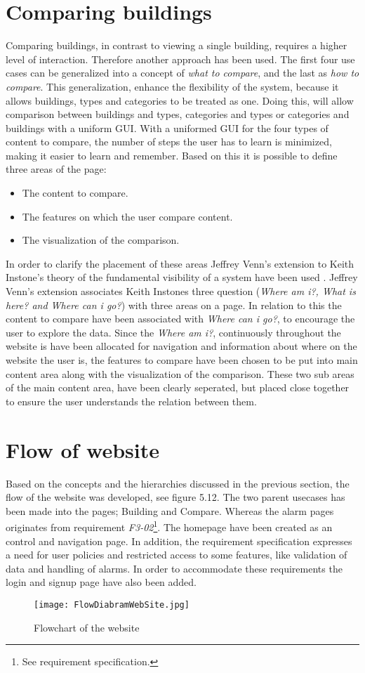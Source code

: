 \section*{Comparing buildings}
Comparing buildings, in contrast to viewing a single building, requires a higher level of interaction. Therefore another approach has been used. The first four use cases can be generalized into a concept of \emph{what to compare}, and the last as \emph{how to compare}. This generalization, enhance the flexibility of the system, because it allows buildings, types and categories to be treated as one. Doing this, will allow comparison between buildings and types, categories and types or categories and buildings with a uniform GUI. With a uniformed GUI for the four types of content to compare, the number of steps the user has to learn is minimized, making it easier to learn and remember. Based on this it is possible to define three areas of the page:
\begin{itemize}
\item The content to compare.
\item The features on which the user compare content.
\item The visualization of the comparison.
\end{itemize}
In order to clarify the placement of these areas Jeffrey Venn's extension to Keith Instone's theory of the fundamental visibility of a system have been used \cite{interaction}. Jeffrey Venn's extension associates Keith Instones three question (\emph{Where am i?, What is here? and Where can i go?}) with three areas on a page. In relation to this the content to compare have been associated with \emph{Where can i go?}, to encourage the user to explore the data. Since the \emph{Where am i?}, continuously throughout the website is have been allocated for navigation and information about where on the website the user is, the features to compare have been chosen to be put into main content area along with the visualization of the comparison. These two sub areas of the main content area, have been clearly seperated, but placed close together to ensure the user understands the relation between them.
\section*{Flow of website}
Based on the concepts and the hierarchies discussed in the previous section, the flow of the website was developed, see figure 5.12. The two parent usecases has been made into the pages; Building and Compare. Whereas the alarm pages originates from requirement \emph{F3-02}\footnote{See requirement specification.}. The homepage have been created as an control and navigation page. In addition, the requirement specification expresses a need for user policies and restricted access to some features, like validation of data and handling of alarms. In order to accommodate these requirements the login and signup page have also been added.
\begin{figure}
\begin{center}
\texttt{[image: FlowDiabramWebSite.jpg]}
\end{center}
\caption{Flowchart of the website}
\end{figure}
